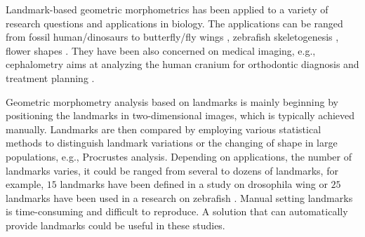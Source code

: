 \documentclass[review]{elsarticle}
\begin{document}
Landmark-based geometric morphometrics has been applied to a variety of research questions and applications in biology. The applications can be ranged from fossil human/dinosaurs \cite{rosas2015geometric, fearon2015morphometric} to butterfly/fly wings \cite{chazot2016morpho}, zebrafish skeletogenesis \cite{aceto2015zebrafish}, flower shapes \cite{van2010three}. They have been also concerned on medical imaging, e.g., cephalometry aims at analyzing the human cranium for orthodontic diagnosis and treatment planning \cite{lindner2016fully, grau2001automatic}. 

Geometric morphometry analysis based on landmarks is mainly beginning by positioning the landmarks in two-dimensional images, which is typically achieved manually. Landmarks are then compared by employing various statistical methods to distinguish landmark variations or the changing of shape in large populations, e.g., Procrustes analysis. Depending on applications, the number of landmarks varies, it could be ranged from several to dozens of landmarks, for example, $15$ landmarks have been defined in a study on drosophila wing \cite{palaniswamy2010automatic} or $25$ landmarks have been used in a research on zebrafish \cite{aceto2015zebrafish, vandaele2018landmark}. Manual setting landmarks is time-consuming and difficult to reproduce. A solution that can automatically provide landmarks could be useful in these studies.
\end{document}
